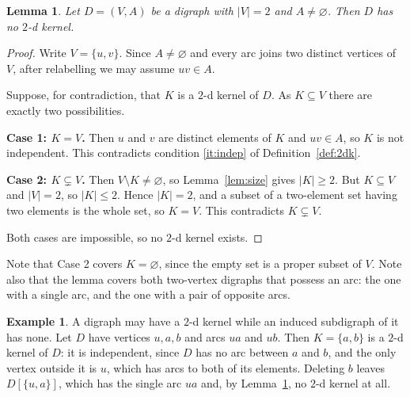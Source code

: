 \documentclass[11pt]{article}
\theoremstyle{plain}
\newtheorem{lemma}[theorem]{Lemma}
\theoremstyle{definition}
\newtheorem{example}[theorem]{Example}
\theoremstyle{remark}
\begin{document}
\begin{lemma}\label{lem:twovertex}
Let $D = (V,A)$ be a digraph with $\lvert V \rvert = 2$ and $A \neq \varnothing$. Then $D$
has no $2$-d kernel.
\end{lemma}

\begin{proof}
Write $V = \{u, v\}$. Since $A \neq \varnothing$ and every arc joins two distinct vertices of
$V$, after relabelling we may assume $uv \in A$.

Suppose, for contradiction, that $K$ is a $2$-d kernel of $D$. As $K \subseteq V$ there are
exactly two possibilities.

\medskip
\noindent\textbf{Case 1: $K = V$.} Then $u$ and $v$ are distinct elements of $K$ and
$uv \in A$, so $K$ is not independent. This contradicts condition \ref{it:indep} of
Definition~\ref{def:2dk}.

\medskip
\noindent\textbf{Case 2: $K \subsetneq V$.} Then $V \setminus K \neq \varnothing$, so
Lemma~\ref{lem:size} gives $\lvert K \rvert \geq 2$. But $K \subseteq V$ and
$\lvert V \rvert = 2$, so $\lvert K \rvert \leq 2$. Hence $\lvert K \rvert = 2$, and a subset
of a two-element set having two elements is the whole set, so $K = V$. This contradicts
$K \subsetneq V$.

\medskip
Both cases are impossible, so no $2$-d kernel exists.
\end{proof}

Note that Case 2 covers $K = \varnothing$, since the empty set is a proper subset of $V$.
Note also that the lemma covers both two-vertex digraphs that possess an arc: the one with
a single arc, and the one with a pair of opposite arcs.

\begin{example}\label{ex:loss}
A digraph may have a $2$-d kernel while an induced subdigraph of it has none. Let $D$ have
vertices $u, a, b$ and arcs $ua$ and $ub$. Then $K = \{a,b\}$ is a $2$-d kernel of $D$: it is
independent, since $D$ has no arc between $a$ and $b$, and the only vertex outside it is $u$,
which has arcs to both of its elements. Deleting $b$ leaves $D[\{u,a\}]$, which has the
single arc $ua$ and, by Lemma~\ref{lem:twovertex}, no $2$-d kernel at all.
\begin{center}
\end{center}
\end{example}
\end{document}
